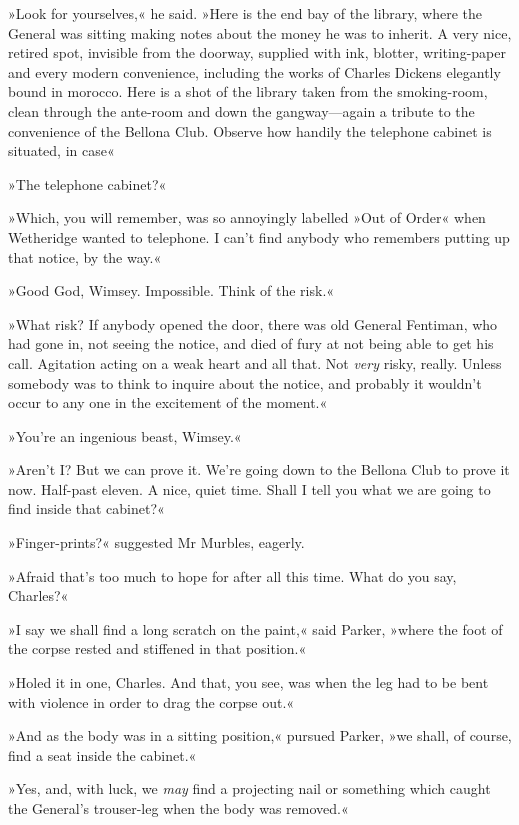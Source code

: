 »Look for yourselves,« he said. »Here is the end bay of the library, where the General was sitting making notes about the money he was to inherit. A very nice, retired spot, invisible from the doorway, supplied with ink, blotter, writing-paper and every modern convenience, including the works of Charles Dickens elegantly bound in morocco. Here is a shot of the library taken from the smoking-room, clean through the ante-room and down the gangway\allowbreak---\allowbreak again a tribute to the convenience of the Bellona Club. Observe how handily the telephone cabinet is situated, in case\longdash«

»The telephone cabinet?«

»Which, you will remember, was so annoyingly labelled »Out of Order« when Wetheridge wanted to telephone. I can't find anybody who remembers putting up that notice, by the way.«

»Good God, Wimsey. Impossible. Think of the risk.«

»What risk? If anybody opened the door, there was old General Fentiman, who had gone in, not seeing the notice, and died of fury at not being able to get his call. Agitation acting on a weak heart and all that. Not \textit{very} risky, really. Unless somebody was to think to inquire about the notice, and probably it wouldn't occur to any one in the excitement of the moment.«

»You're an ingenious beast, Wimsey.«

»Aren't I? But we can prove it. We're going down to the Bellona Club to prove it now. Half-past eleven. A nice, quiet time. Shall I tell you what we are going to find inside that cabinet?«

»Finger-prints?« suggested Mr Murbles, eagerly.

»Afraid that's too much to hope for after all this time. What do you say, Charles?«

»I say we shall find a long scratch on the paint,« said Parker, »where the foot of the corpse rested and stiffened in that position.«

»Holed it in one, Charles. And that, you see, was when the leg had to be bent with violence in order to drag the corpse out.«

»And as the body was in a sitting position,« pursued Parker, »we shall, of course, find a seat inside the cabinet.«

»Yes, and, with luck, we \textit{may} find a projecting nail or something which caught the General's trouser-leg when the body was removed.«

